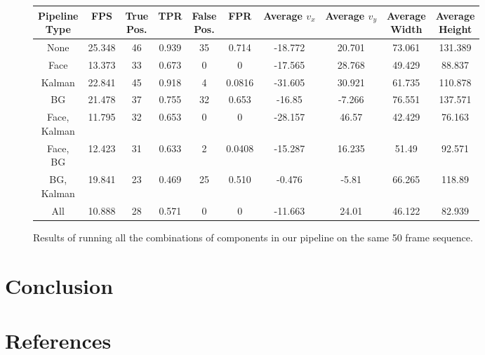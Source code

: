 \documentclass[12pt]{article}
\begin{document}
\noindent
\begin{figure}[H]
\begin{center}
\begin{tabular}{|c|c|c|c|c|c|c|c|c|c|}
\hline
\shortstack{Pipeline \\ Type} &		FPS &	\shortstack{True \\ Pos.} &	TPR &		\shortstack{False \\ Pos. }&	 FPR &		\shortstack{Average \\ $v_x$} & 	\shortstack{Average \\ $v_y$} & 	\shortstack{Average \\ Width} &	\shortstack{Average \\Height} \\	\hline \hline
None    & 	25.348	  & 	46		        &	0.939     &		35                        &	0.714     &		-18.772 &	20.701 &	73.061 &	131.389	\\ \hline
Face &	13.373 &	33 &	0.673 &	0 &	0 &	-17.565 &	28.768	& 49.429	& 88.837 \\ \hline
Kalman &	22.841 &	45	&0.918	&4	&0.0816&	-31.605	&30.921	&61.735&	110.878		\\ \hline
BG	 & 21.478&	37	&0.755	&32	&0.653	&-16.85	&-7.266	&76.551	&137.571		\\ \hline
\shortstack{Face, \\ Kalman}	&11.795&	32	&0.653&	0	&0&	-28.157	&46.57	&42.429&	76.163	\\ \hline
\shortstack{Face, \\ BG}	&12.423&	31	&0.633&	2	&0.0408&	-15.287&	16.235&	51.49&	92.571		\\ \hline
\shortstack{BG, \\ Kalman}&	19.841&	23&	0.469	&25	&0.510	&-0.476	&-5.81	&66.265&	118.89	\\ \hline
All	&10.888&	28	&0.571&	0	&0	&-11.663&	24.01&	46.122	&82.939 \\
\hline
\end{tabular}
\end{center}
\caption{Results of running all the combinations of components in our pipeline on the same 50 frame sequence.}
\label{datatable}
\end{figure}


\section{Conclusion}

\section{References}
\end{document}
